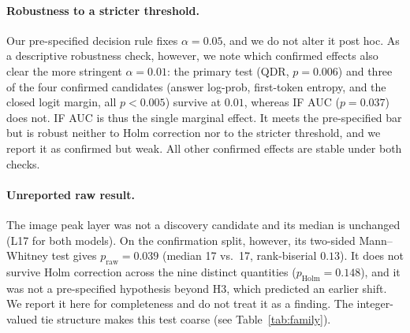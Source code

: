 \paragraph{Robustness to a stricter threshold.} Our pre-specified decision rule fixes
$\alpha{=}0.05$, and we do not alter it post hoc. As a descriptive robustness check,
however, we note which confirmed effects also clear the more stringent $\alpha{=}0.01$:
the primary test (QDR, $p{=}0.006$) and three of the four confirmed candidates
(answer log-prob, first-token entropy, and the closed logit margin, all
$p{<}0.005$) survive at $0.01$, whereas IF AUC ($p{=}0.037$) does not. IF AUC is thus
the single marginal effect. It meets the pre-specified bar but is robust neither to
Holm correction nor to the stricter threshold, and we report it as confirmed but
weak. All other confirmed effects are stable under both checks.

\paragraph{Unreported raw result.} The image peak layer was not a discovery candidate and
its median is unchanged (L17 for both models). On the confirmation split, however, its
two-sided Mann--Whitney test gives $p_\text{raw}{=}0.039$ (median 17 vs.\ 17, rank-biserial
$0.13$). It does not survive Holm correction across the nine distinct quantities
($p_\text{Holm}{=}0.148$), and it was not a pre-specified hypothesis beyond H3, which
predicted an earlier shift. We report it here for completeness and do not treat it as a
finding. The integer-valued tie structure makes this test coarse (see Table~\ref{tab:family}).
